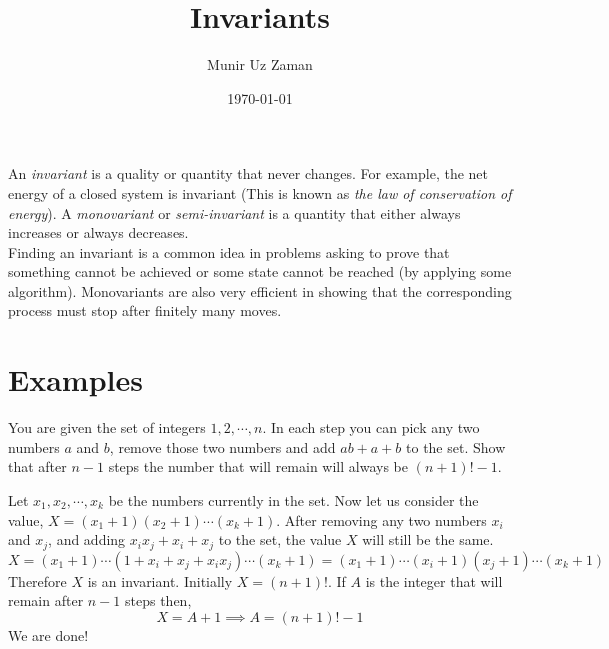 \documentclass[11pt,numbers=noenddot,svgnames,dvipsnames]{scrartcl}
\title{Invariants}
\author{Munir Uz Zaman}
\date{\today}
\begin{document}
\maketitle

An \emph{invariant} is a quality or quantity that never changes. 
For example, the net energy of a closed system is invariant 
(This is known as \emph{the law of conservation of energy}). 
A \emph{monovariant} or \emph{semi-invariant} is a quantity 
that either always increases or always decreases. \\
Finding an invariant is a common idea in problems asking to prove that 
something cannot be achieved or some state cannot be reached (by applying some algorithm). 
Monovariants are also very efficient in showing that the corresponding process must stop after finitely many moves.

\section{Examples}

\begin{problem}
    You are given the set of integers $1, 2, \cdots, n$. 
    In each step you can pick any two numbers $a$ and $b$, 
    remove those two numbers and add $ab+a+b$ to the set. 
    Show that after $n-1$ steps the number that will remain will always be $(n+1)! -1$.
\end{problem}
\begin{sol}
    Let $x_{1}, x_{2}, \cdots, x_{k}$ be the numbers currently in the set. 
    Now let us consider the value, $X = (x_{1}+1)(x_{2}+1)\cdots (x_{k}+1)$. 
    After removing any two numbers $x_{i}$ and $x_{j}$, and adding 
    $x_{i}x_{j} + x_{i} + x_{j}$ to the set, the value $X$ will still be the same.
    \[
        X = (x_{1} + 1) \cdots (1 + x_{i} + x_{j} + x_{i}x_{j}) \cdots (x_{k} + 1) 
          = (x_{1} + 1) \cdots (x_{i} + 1) (x_{j} + 1) \cdots (x_{k} + 1)
    \]
    Therefore $X$ is an invariant. Initially $X=(n+1)!$. If $A$ is the integer 
    that will remain after $n-1$ steps then, 
    \[
        X = A+1 \implies A = (n+1)! - 1
    \]
    We are done!
\end{sol}
\end{document}
